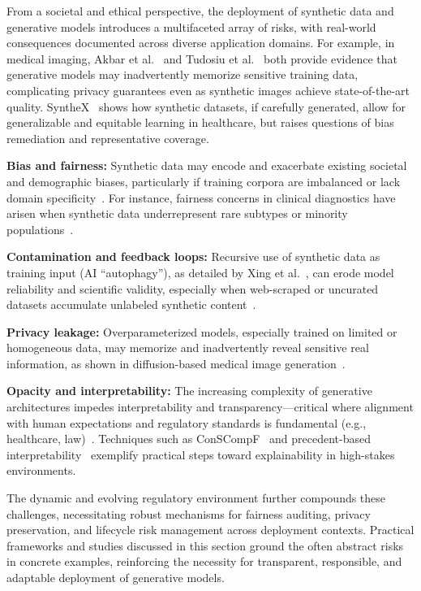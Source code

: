 \documentclass[sigconf]{acmart}
\begin{document}
From a societal and ethical perspective, the deployment of synthetic data and generative models introduces a multifaceted array of risks, with real-world consequences documented across diverse application domains. For example, in medical imaging, Akbar et al.~\cite{ref21} and Tudosiu et al.~\cite{ref60} both provide evidence that generative models may inadvertently memorize sensitive training data, complicating privacy guarantees even as synthetic images achieve state-of-the-art quality. SyntheX~\cite{ref81} shows how synthetic datasets, if carefully generated, allow for generalizable and equitable learning in healthcare, but raises questions of bias remediation and representative coverage.

\textbf{Bias and fairness:} Synthetic data may encode and exacerbate existing societal and demographic biases, particularly if training corpora are imbalanced or lack domain specificity~\cite{ref21,ref24,ref58,ref63,ref81}. For instance, fairness concerns in clinical diagnostics have arisen when synthetic data underrepresent rare subtypes or minority populations~\cite{ref63}.

\textbf{Contamination and feedback loops:} Recursive use of synthetic data as training input (AI ``autophagy''), as detailed by Xing et al.~\cite{ref82}, can erode model reliability and scientific validity, especially when web-scraped or uncurated datasets accumulate unlabeled synthetic content~\cite{ref77,ref78,ref84}.

\textbf{Privacy leakage:} Overparameterized models, especially trained on limited or homogeneous data, may memorize and inadvertently reveal sensitive real information, as shown in diffusion-based medical image generation~\cite{ref21,ref81,ref82,ref88,ref90}.

\textbf{Opacity and interpretability:} The increasing complexity of generative architectures impedes interpretability and transparency—critical where alignment with human expectations and regulatory standards is fundamental (e.g., healthcare, law)~\cite{ref10,ref32,ref60,ref68,ref69,ref78,ref81,ref82}. Techniques such as ConSCompF~\cite{ref68} and precedent-based interpretability~\cite{ref84} exemplify practical steps toward explainability in high-stakes environments.

The dynamic and evolving regulatory environment further compounds these challenges, necessitating robust mechanisms for fairness auditing, privacy preservation, and lifecycle risk management across deployment contexts. Practical frameworks and studies discussed in this section ground the often abstract risks in concrete examples, reinforcing the necessity for transparent, responsible, and adaptable deployment of generative models.
\end{document}
